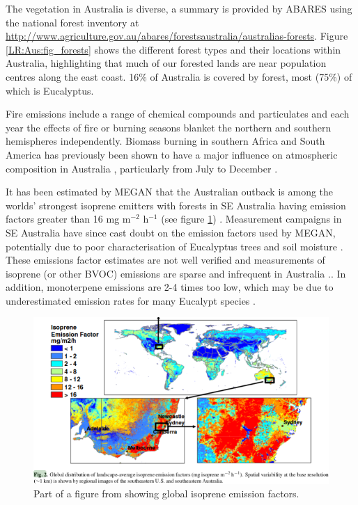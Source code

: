   The vegetation in Australia is diverse, a summary is provided by ABARES using the national forest inventory at  \url{http://www.agriculture.gov.au/abares/forestsaustralia/australias-forests}.
  Figure \ref{LR:Aus:fig_forests} shows the different forest types and their locations within Australia, highlighting that much of our forested lands are near population centres along the east coast.
  16\% of Australia is covered by forest, most (75\%) of which is Eucalyptus.
  
  
  Fire emissions include a range of chemical compounds and particulates and each year the effects of fire or burning seasons blanket the northern and southern hemispheres independently.
  Biomass burning in southern Africa and South America has previously been shown to have a major influence on atmospheric composition in Australia \parencite{Oltmans2001, Gloudemans2006, Edwards2006}, particularly from July to December \parencite{Pak2003, Liu2016}.
  
  It has been estimated by MEGAN that the Australian outback is among the worlds' strongest isoprene emitters with forests in SE Australia having emission factors greater than 16 mg m$^{-2}$ h$^{-1}$ (see figure \ref{LR:Aus:fig_MEGAN_EF}) \parencite{Guenther2006,Guenther2012}.
  Measurement campaigns in SE Australia have since cast doubt on the emission factors used by MEGAN, potentially due to poor characterisation of Eucalyptus trees and soil moisture \parencite{Emmerson2016}.
  These emissions factor estimates are not well verified and measurements of isoprene (or other BVOC) emissions are sparse and infrequent in Australia \parencite{Sindelarova2014, Bauwens2016}..
  In addition, monoterpene emissions are 2-4 times too low, which may be due to underestimated emission rates for many Eucalypt species \parencite{Winters2009,Emmerson2016}.

  \begin{figure}
    \includegraphics[width=\textwidth]{Figures/MeganIsoprene1.png}
    \caption{ Part of a figure from \textcite{Guenther2006} showing global isoprene emission factors. }
    \label{LR:Aus:fig_MEGAN_EF}
  \end{figure}
  
